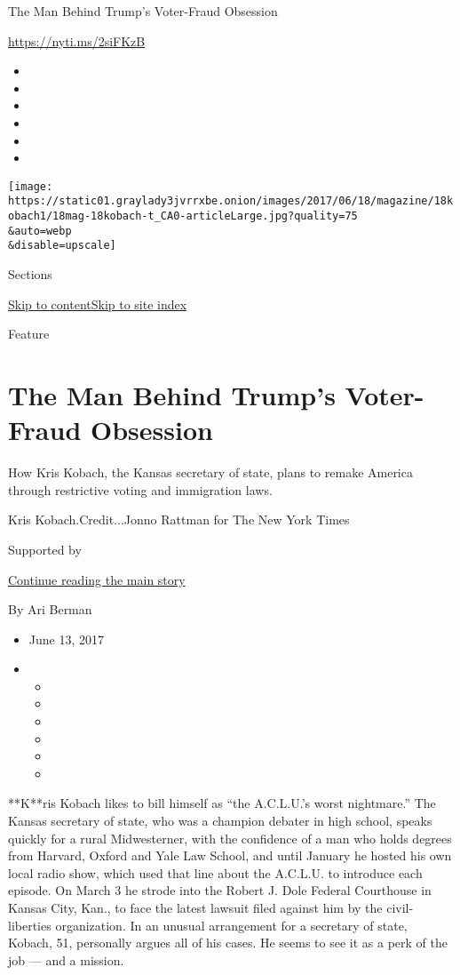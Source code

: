 The Man Behind Trump's Voter-Fraud Obsession

\url{https://nyti.ms/2siFKzB}

\begin{itemize}
\item
\item
\item
\item
\item
\item
\end{itemize}

\texttt{[image: https://static01.graylady3jvrrxbe.onion/images/2017/06/18/magazine/18kobach1/18mag-18kobach-t\_CA0-articleLarge.jpg?quality=75\\\&auto=webp\\\&disable=upscale]}

Sections

\protect\hyperlink{site-content}{Skip to
content}\protect\hyperlink{site-index}{Skip to site index}

Feature

\hypertarget{the-man-behind-trumps-voter-fraud-obsession}{%
\section{The Man Behind Trump's Voter-Fraud
Obsession}\label{the-man-behind-trumps-voter-fraud-obsession}}

How Kris Kobach, the Kansas secretary of state, plans to remake America
through restrictive voting and immigration laws.

Kris Kobach.Credit...Jonno Rattman for The New York Times

Supported by

\protect\hyperlink{after-sponsor}{Continue reading the main story}

By Ari Berman

\begin{itemize}
\item
  June 13, 2017
\item
  \begin{itemize}
  \item
  \item
  \item
  \item
  \item
  \item
  \end{itemize}
\end{itemize}

**K**ris Kobach likes to bill himself as ``the A.C.L.U.'s worst
nightmare.'' The Kansas secretary of state, who was a champion debater
in high school, speaks quickly for a rural Midwesterner, with the
confidence of a man who holds degrees from Harvard, Oxford and Yale Law
School, and until January he hosted his own local radio show, which used
that line about the A.C.L.U. to introduce each episode. On March 3 he
strode into the Robert J. Dole Federal Courthouse in Kansas City, Kan.,
to face the latest lawsuit filed against him by the civil-liberties
organization. In an unusual arrangement for a secretary of state,
Kobach, 51, personally argues all of his cases. He seems to see it as a
perk of the job --- and a mission.

